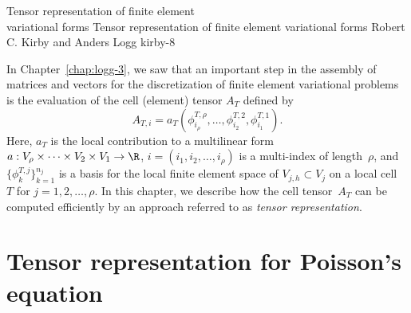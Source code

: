 \begingroup

\setcounter{chapter}{7}
\setcounter{chpnum}{7}

              {Tensor representation of finite element \\ variational forms}
              {Tensor representation of finite element variational forms}
              {Robert C. Kirby and Anders Logg}
              {kirby-8}

In Chapter~\ref{chap:logg-3}, we saw that an important step in the
assembly of matrices and vectors for the discretization of finite
element variational problems is the evaluation of the cell (element)
tensor $A_T$ defined by
\begin{equation}
  A_{T,i}
  = a_T(\phi^{T,\rho}_{i_{\rho}}, \ldots, \phi^{T,2}_{i_2}, \phi^{T,1}_{i_1}).
\end{equation}
Here, $a_T$ is the local contribution to a multilinear form $a:
V_{\rho} \times \cdots \times V_2 \times V_1 \rightarrow \R$,
$i=(i_1,i_2,\dots,i_\rho)$ is a multi-index of length~$\rho$, and
$\{\phi^{T,j}_k\}_{k=1}^{n_j}$ is a basis for the local finite element
space of $V_{j,h} \subset V_j$ on a local cell~$T$ for $j =
1,2,\ldots,\rho$. In this chapter, we describe how the cell
tensor~$A_T$ can be computed efficiently by an approach referred to as
\emph{tensor representation}.

\section{Tensor representation for Poisson's equation}

